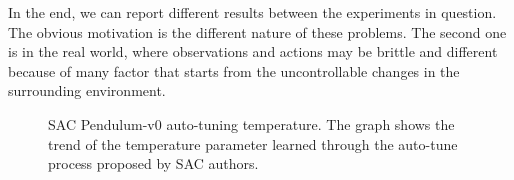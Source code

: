 In the end, we can report different results between the experiments in question.
The obvious motivation is the different nature of these problems.
The second one is in the real world, where observations and actions may be brittle and different because of many factor that starts from the uncontrollable changes in the surrounding environment.

%
%

\begin{figure}[!h]
	\centering
	\caption[SAC CozmoDriver-v0 auto-tuning temperature]{SAC Pendulum-v0 auto-tuning temperature. The graph shows the trend of the temperature parameter learned through the auto-tune process proposed by SAC authors.}
	\label{fig:sac_cozmo_temperature}
\end{figure}


%
%


